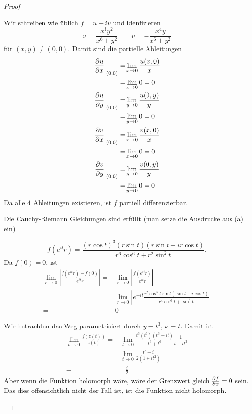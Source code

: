 \begin{proof}
	\begin{parts}
	\item Wir schreiben wie üblich $f=u+iv$ und idenfizieren
		\[
		u=\frac{x^3 y^2}{x^6 + y^2}\qquad v = -\frac{x^4 y}{x^6+ y^2}
		\] 
		f\"{u}r $(x,y)\neq (0,0)$. Damit sind die partielle Ableitungen
		\begin{align*}
			\left.\pdv{u}{x}\right|_{(0,0)}=&\lim_{x \to 0} \frac{u(x,0)}{x}\\
			=&\lim_{x \to 0} 0 =0\\
			\left. \pdv{u}{y}\right|_{(0,0)}=&\lim_{y \to 0} \frac{u(0,y)}{y}\\
			=&\lim_{y \to 0} 0=0\\
			\left. \pdv{v}{x}\right|_{(0,0)}=&\lim_{x \to 0} \frac{v(x,0)}{x}\\
			=&\lim_{x \to 0} 0=0\\
			\left.\pdv{v}{y}\right|_{(0,0)}=&\lim_{y \to 0} \frac{v(0,y)}{y}\\
			=&\lim_{y \to 0} 0=0
		\end{align*}
		Da alle $4$ Ableitungen existieren, ist $f$ partiell differenzierbar.
	\item Die Cauchy-Riemann Gleichungen sind erfüllt (man setze die Ausdrucke aus (a) ein) 
	\item 
		\[
			f(e^{it} r)=\frac{(r\cos t)^3(r\sin t)(r\sin t - i r\cos t)}{r^6 \cos^6 t + r^2\sin^2 t}
		.\] 
		Da $f(0)=0$, ist
		\begin{align*}
			\lim_{r \to 0} \left|\frac{f(e^{it}r)-f(0)}{e^{it}r}\right|=&\lim_{r \to 0} \left|\frac{f(e^{it}r)}{e^{it}r}\right|\\
			=&\lim_{r \to 0} \left|e^{-it} \frac{r^2 \cos^3 t \sin t(\sin t - i \cos t)}{r^4 \cos^6 t + \sin^2 t}\right|\\
			=&0
		\end{align*}
	\item Wir betrachten das Weg parametrisiert durch $y=t^3$, $x=t$. Damit ist
		\begin{align*}
			\lim_{t \to 0} \frac{f(z(t))}{z(t)}=& \lim_{t \to 0} \frac{t^3(t^3)(t^3-it)}{t^6+t^6} \frac{1}{t+it^3}\\
			=&\lim_{t \to 0} \frac{t^2-i}{2(1+i t^2)}\\
			=& -\frac{i}{2}
		\end{align*}
		Aber wenn die Funktion holomorph wäre, wäre der Grenzwert gleich $\pdv{f}{x}=0$ sein. Das dies offensichtlich nicht der Fall ist, ist die Funktion nicht holomorph.\qedhere
	\end{parts}
\end{proof}
